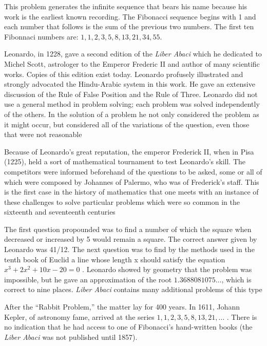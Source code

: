 \documentclass[10pt,]{book}
\theoremstyle{plain}
\theoremstyle{definition}
\theoremstyle{definition}
\numberwithin{equation}{chapter}
\begin{document}
\par
\hypertarget{p-7}{}%
This problem generates the infinite sequence that bears his name because his work is the earliest known recording. The Fibonacci sequence begins with 1 and each number that follows is the sum of the previous two numbers. The first ten Fibonnaci numbers are: \(1, 1, 2, 3, 5, 8, 13, 21,
34, 55\).%
\par
\hypertarget{p-8}{}%
Leonardo, in 1228, gave a second edition of the \emph{Liber Abaci} which he dedicated to Michel Scott, astrologer to the Emperor Frederic II and author of many scientific works. Copies of this edition exist today. Leonardo profusely illustrated and strongly advocated the Hindu-Arabic system in this work. He gave an extensive discussion of the Rule of False Position and the Rule of Three. Leonardo did not use a general method in problem solving; each problem was solved independently of the others. In the solution of a problem he not only considered the problem as it might occur, but considered all of the variations of the question, even those that were not reasonable%
\par
\hypertarget{p-9}{}%
Because of Leonardo's great reputation, the emperor Frederick II, when in Pisa (1225), held a sort of mathematical tournament to test Leonardo's skill. The competitors were informed beforehand of the questions to be asked, some or all of which were composed by Johannes of Palermo, who was of Frederick's staff. This is the first case in the history of mathematics that one meets with an instance of these challenges to solve particular problems which were so common in the sixteenth and seventeenth centuries%
\par
\hypertarget{p-10}{}%
The first question propounded was to find a number of which the square when decreased or increased by 5 would remain a square. The correct answer given by Leonardo was 41/12. The next question was to find by the methods used in the tenth book of Euclid a line whose length x should satisfy the equation \(x^3 + 2x^2 + 10x - 20 = 0\) . Leonardo showed by geometry that the problem was impossible, but he gave an approximation of the root \(1.3688081075\ldots\), which is correct to nine places. \emph{Liber Abaci} contains many additional problems of this type%
\par
\hypertarget{p-11}{}%
After the ``Rabbit Problem,'' the matter lay for 400 years. In 1611, Johann Kepler, of astronomy fame, arrived at the series \(1, 1, 2, 3, 5,
8, 13, 21, \ldots\) . There is no indication that he had access to one of Fibonacci's hand-written books (the \emph{Liber Abaci} was not published until 1857).%
\end{document}
